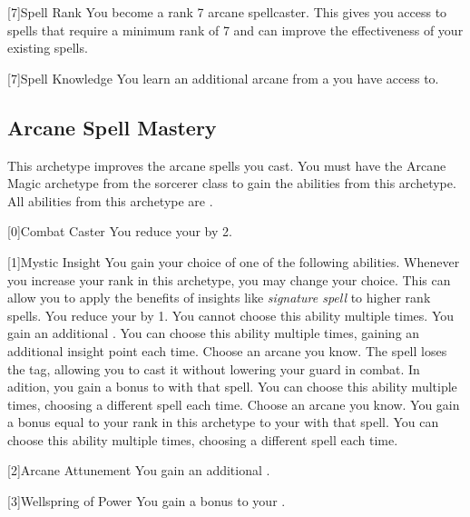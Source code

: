         [7]{Spell Rank} You become a rank 7 arcane spellcaster.
        This gives you access to spells that require a minimum rank of 7 and can improve the effectiveness of your existing spells.

        [7]{Spell Knowledge} You learn an additional arcane  from a  you have access to.

    \newpage
    \subsection{Arcane Spell Mastery}
        This archetype improves the arcane spells you cast.
        You must have the Arcane Magic archetype from the sorcerer class to gain the abilities from this archetype.
        All abilities from this archetype are .

        [0]{Combat Caster} You reduce your  by 2.

        [1]{Mystic Insight}
        You gain your choice of one of the following abilities.
        Whenever you increase your rank in this archetype, you may change your choice.
        This can allow you to apply the benefits of insights like \textit{signature spell} to higher rank spells.
        {
             You reduce your  by 1.
                You cannot choose this ability multiple times.
             You gain an additional .
                You can choose this ability multiple times, gaining an additional insight point each time.
             Choose an arcane  you know.
                The spell loses the  tag, allowing you to cast it without lowering your guard in combat.
                In adition, you gain a  bonus to  with that spell.
                You can choose this ability multiple times, choosing a different spell each time.
             Choose an arcane  you know.
                You gain a bonus equal to your rank in this archetype to your  with that spell.
                You can choose this ability multiple times, choosing a different spell each time.
        }

        [2]{Arcane Attunement} You gain an additional .

        [3]{Wellspring of Power}
        You gain a  bonus to your  .

